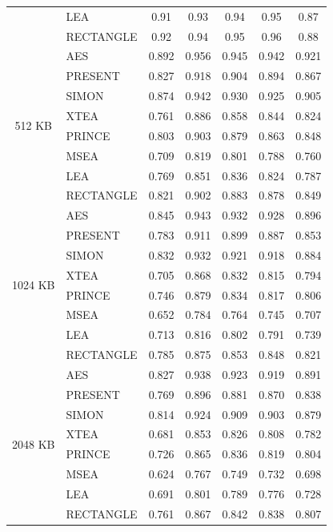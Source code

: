\documentclass[12pt]{article}
\begin{document}
\begin{table}[p]
{\begin{tabular}{|c|l|c|c|c|c|c|}
& LEA        & 0.91 & 0.93 & 0.94 & 0.95 & 0.87 \\
& RECTANGLE  & 0.92 & 0.94 & 0.95 & 0.96 & 0.88 \\
\hline
\multirow{8}{*}{512 KB}
& AES        & 0.892 & 0.956 & 0.945 & 0.942 & 0.921 \\
& PRESENT    & 0.827 & 0.918 & 0.904 & 0.894 & 0.867 \\
& SIMON      & 0.874 & 0.942 & 0.930 & 0.925 & 0.905 \\
& XTEA       & 0.761 & 0.886 & 0.858 & 0.844 & 0.824 \\
& PRINCE     & 0.803 & 0.903 & 0.879 & 0.863 & 0.848 \\
& MSEA       & 0.709 & 0.819 & 0.801 & 0.788 & 0.760 \\
& LEA        & 0.769 & 0.851 & 0.836 & 0.824 & 0.787 \\
& RECTANGLE  & 0.821 & 0.902 & 0.883 & 0.878 & 0.849 \\
\hline
\multirow{8}{*}{1024 KB}
& AES        & 0.845 & 0.943 & 0.932 & 0.928 & 0.896 \\
& PRESENT    & 0.783 & 0.911 & 0.899 & 0.887 & 0.853 \\
& SIMON      & 0.832 & 0.932 & 0.921 & 0.918 & 0.884 \\
& XTEA       & 0.705 & 0.868 & 0.832 & 0.815 & 0.794 \\
& PRINCE     & 0.746 & 0.879 & 0.834 & 0.817 & 0.806 \\
& MSEA       & 0.652 & 0.784 & 0.764 & 0.745 & 0.707 \\
& LEA        & 0.713 & 0.816 & 0.802 & 0.791 & 0.739 \\
& RECTANGLE  & 0.785 & 0.875 & 0.853 & 0.848 & 0.821 \\
\hline
\multirow{8}{*}{2048 KB}
& AES        & 0.827 & 0.938 & 0.923 & 0.919 & 0.891 \\
& PRESENT    & 0.769 & 0.896 & 0.881 & 0.870 & 0.838 \\
& SIMON      & 0.814 & 0.924 & 0.909 & 0.903 & 0.879 \\
& XTEA       & 0.681 & 0.853 & 0.826 & 0.808 & 0.782 \\
& PRINCE     & 0.726 & 0.865 & 0.836 & 0.819 & 0.804 \\
& MSEA       & 0.624 & 0.767 & 0.749 & 0.732 & 0.698 \\
& LEA        & 0.691 & 0.801 & 0.789 & 0.776 & 0.728 \\
& RECTANGLE  & 0.761 & 0.867 & 0.842 & 0.838 & 0.807 \\
\hline
\end{tabular}%
}
\end{table}
\end{document}
